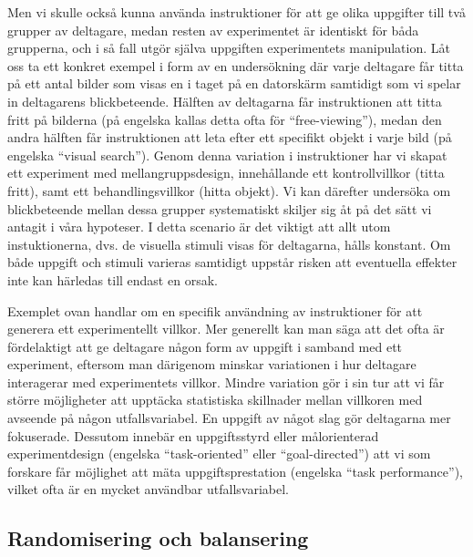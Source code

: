 \documentclass[
]{book}
\begin{document}
Men vi skulle också kunna använda instruktioner för att ge olika uppgifter till två grupper av deltagare, medan resten av experimentet är identiskt för båda grupperna, och i så fall utgör själva uppgiften experimentets manipulation. Låt oss ta ett konkret exempel i form av en undersökning där varje deltagare får titta på ett antal bilder som visas en i taget på en datorskärm samtidigt som vi spelar in deltagarens blickbeteende. Hälften av deltagarna får instruktionen att titta fritt på bilderna (på engelska kallas detta ofta för ``free-viewing''), medan den andra hälften får instruktionen att leta efter ett specifikt objekt i varje bild (på engelska ``visual search''). Genom denna variation i instruktioner har vi skapat ett experiment med mellangruppsdesign, innehållande ett kontrollvillkor (titta fritt), samt ett behandlingsvillkor (hitta objekt). Vi kan därefter undersöka om blickbeteende mellan dessa grupper systematiskt skiljer sig åt på det sätt vi antagit i våra hypoteser. I detta scenario är det viktigt att allt utom instuktionerna, dvs. de visuella stimuli visas för deltagarna, hålls konstant. Om både uppgift och stimuli varieras samtidigt uppstår risken att eventuella effekter inte kan härledas till endast en orsak.

Exemplet ovan handlar om en specifik användning av instruktioner för att generera ett experimentellt villkor. Mer generellt kan man säga att det ofta är fördelaktigt att ge deltagare någon form av uppgift i samband med ett experiment, eftersom man därigenom minskar variationen i hur deltagare interagerar med experimentets villkor. Mindre variation gör i sin tur att vi får större möjligheter att upptäcka statistiska skillnader mellan villkoren med avseende på någon utfallsvariabel. En uppgift av något slag gör deltagarna mer fokuserade. Dessutom innebär en uppgiftsstyrd eller målorienterad experimentdesign (engelska ``task-oriented'' eller ``goal-directed'') att vi som forskare får möjlighet att mäta uppgiftsprestation (engelska ``task performance''), vilket ofta är en mycket användbar utfallsvariabel.

\hypertarget{sub07.5.2}{%
\subsection{Randomisering och balansering}\label{sub07.5.2}}
\end{document}
